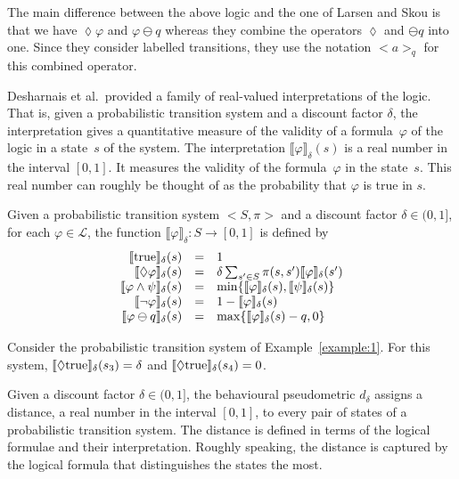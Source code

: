 \documentclass{LMCS}
\newcommand{\interpretation}[1]{\llbracket #1 \rrbracket_{\delta}}
\newcommand{\modality}{\lozenge}
\begin{document}
The main difference between
the above logic and the one of Larsen and Skou is that we have 
$\modality \varphi$ and $\varphi \ominus q$ whereas they combine the 
operators $\modality$ and $\ominus q$ into one.  Since they consider
labelled transitions, they use the notation $<a>_q$ for this
combined operator.

Desharnais et al.\ provided a family of real-valued interpretations
of the logic.  That is, given a probabilistic transition system and
a discount factor $\delta$, the interpretation gives a quantitative
measure of the validity of a formula~$\varphi$ of the logic in a 
state~$s$ of the system.  The interpretation $\interpretation{\varphi}(s)$
is a real number in the interval $[0, 1]$.  It measures the validity
of the formula~$\varphi$ in the state~$s$.  This real number can roughly
be thought of as the probability that $\varphi$ is true in $s$.

\begin{defi}
Given a probabilistic transition system $<S, \pi>$ and 
a discount factor $\delta \in (0, 1]$, for each $\varphi \in \mathcal{L}$, 
the function $\interpretation{\varphi} : S \to [0, 1]$ is defined by
\begin{displaymath}
\begin{array}{rcl}
\interpretation{\mbox{\rm true}}(s)
& = &
1\\
\interpretation{\modality \varphi}(s)
& = &
\delta \sum_{s' \in S} \pi(s, s') \interpretation{\varphi}(s')\\
\interpretation{\varphi \wedge \psi}(s)
& = &
\min \{ \interpretation{\varphi}(s), \interpretation{\psi}(s) \}\\
\interpretation{\neg \varphi}(s)
& = &
1 - \interpretation{\varphi}(s)\\
\interpretation{\varphi \ominus q}(s)
& = &
\max \{ \interpretation{\varphi}(s) - q, 0 \}
\end{array}
\end{displaymath}
\end{defi}

\begin{exa}
Consider the probabilistic transition system of Example~\ref{example:1}.
For this system, $\interpretation{\modality \mbox{\rm true}}(s_3) = \delta$
and $\interpretation{\modality \mbox{\rm true}}(s_4) = 0$.
\end{exa}

Given a discount factor $\delta \in (0, 1]$, the behavioural pseudometric
$d_{\delta}$ assigns a distance, a real number in the interval $[0, 1]$,
to every pair of states of a probabilistic transition system.  The distance
is defined in terms of the logical formulae and their interpretation.
Roughly speaking, the distance is captured by the logical formula that
distinguishes the states the most.
\end{document}

